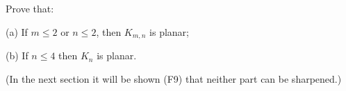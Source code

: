 Prove that:

(a) If $m \leq 2$ or $n \leq 2$, then $K_{m,n}$ is planar;

(b) If $n \leq 4$ then $K_n$ is planar.

(In the next section it will be shown (F9) that neither part can be sharpened.)
